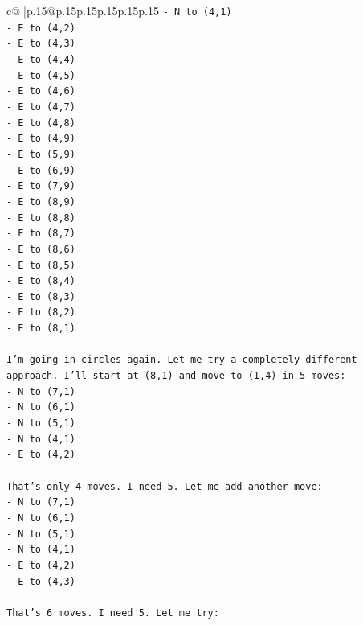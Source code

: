 \documentclass{article}
\begin{document}
{\begin{supertabular}{c@{$\;$}|p{.15\linewidth}@{}p{.15\linewidth}p{.15\linewidth}p{.15\linewidth}p{.15\linewidth}p{.15\linewidth}}
{{{\texttt{{-} N to (4,1)} \\
\texttt{{-} E to (4,2)} \\
\texttt{{-} E to (4,3)} \\
\texttt{{-} E to (4,4)} \\
\texttt{{-} E to (4,5)} \\
\texttt{{-} E to (4,6)} \\
\texttt{{-} E to (4,7)} \\
\texttt{{-} E to (4,8)} \\
\texttt{{-} E to (4,9)} \\
\texttt{{-} E to (5,9)} \\
\texttt{{-} E to (6,9)} \\
\texttt{{-} E to (7,9)} \\
\texttt{{-} E to (8,9)} \\
\texttt{{-} E to (8,8)} \\
\texttt{{-} E to (8,7)} \\
\texttt{{-} E to (8,6)} \\
\texttt{{-} E to (8,5)} \\
\texttt{{-} E to (8,4)} \\
\texttt{{-} E to (8,3)} \\
\texttt{{-} E to (8,2)} \\
\texttt{{-} E to (8,1)} \\
\\ 
\texttt{I'm going in circles again. Let me try a completely different approach. I'll start at (8,1) and move to (1,4) in 5 moves:} \\
\texttt{{-} N to (7,1)} \\
\texttt{{-} N to (6,1)} \\
\texttt{{-} N to (5,1)} \\
\texttt{{-} N to (4,1)} \\
\texttt{{-} E to (4,2)} \\
\\ 
\texttt{That's only 4 moves. I need 5. Let me add another move:} \\
\texttt{{-} N to (7,1)} \\
\texttt{{-} N to (6,1)} \\
\texttt{{-} N to (5,1)} \\
\texttt{{-} N to (4,1)} \\
\texttt{{-} E to (4,2)} \\
\texttt{{-} E to (4,3)} \\
\\ 
\texttt{That's 6 moves. I need 5. Let me try:} \\
}}}
\end{supertabular}}
\end{document}
